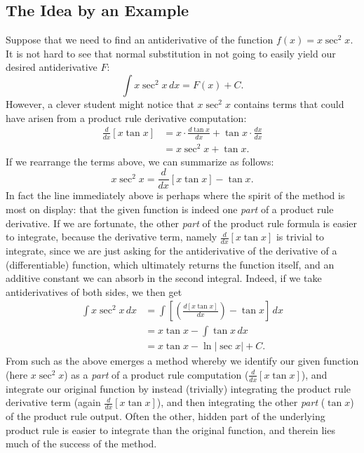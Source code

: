\subsection{The Idea by an Example\label{IntByPartsSubsec''TheIdea''}}
Suppose that we need to find an antiderivative of the function
$f(x)=x\sec^2 x$.  It is not hard to see that normal substitution
in not going to easily yield our desired antiderivative $F$:
$$\int x\sec^2x\,dx=F(x)+C.$$  
However, a clever student might notice that $x\sec^2 x$
contains terms that could have arisen from
a product rule derivative computation:
\begin{align*}\frac{d}{dx}\left[x\tan x\right]
  &=x\cdot\frac{d\tan x}{dx}+\tan x\cdot\frac{dx}{dx}\\
  &=x\sec^2x+\tan x.\end{align*}
If we rearrange the terms above, we can summarize as follows:
$$x\sec^2x=\frac{d}{dx}\left[x\tan x\right]-\tan x.$$
In fact the line immediately
above is perhaps where the spirit of the method is
most on display:  that the given function is indeed one {\it part}
of a product rule derivative.  If we are fortunate, the other
{\it part} of the product rule formula is easier to integrate,
because the derivative term, namely $\frac{d}{dx}\left[x\tan x\right]$
is trivial to integrate, since we are just asking for the antiderivative
of the derivative of a (differentiable) function, which ultimately 
returns the function itself, and an additive constant we can absorb
in the second integral.
Indeed, if we take antiderivatives of both sides, we then get
\begin{align*}\int x\sec^2x\,dx&=\int\left[\left(\frac{d[x\tan x]}{dx}\right)
               -\tan x\right]\,dx\\
             &=x\tan x-\int\tan x\,dx\\
             &=x\tan x-\ln|\sec x|+C.\end{align*}
From such as the above emerges a method whereby we identify
our given function (here $x\sec^2x$) as a {\it part} of a product rule 
computation ($\frac{d}{dx}[x\tan x]$),
and integrate our original function by instead (trivially) integrating the
product rule derivative term (again $\frac{d}{dx}[x\tan x]$), 
and then integrating the other {\it part} ($\tan x$)
of the product rule output.  Often the other, hidden part of the
underlying product rule is easier to integrate than the original
function, and therein lies much of the success of the method.


